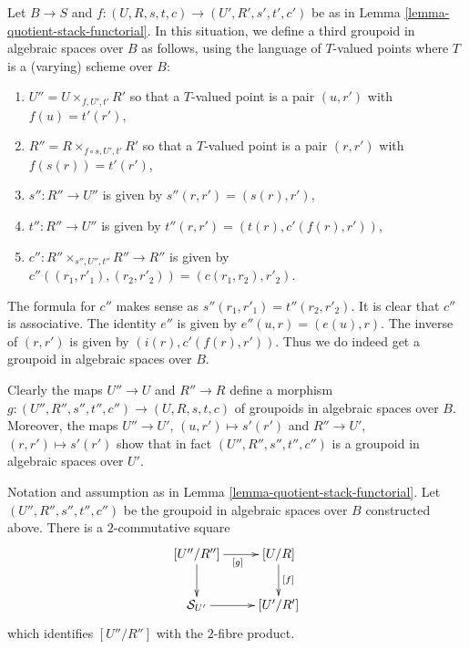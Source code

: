 \noindent
Let $B \to S$ and $f : (U, R, s, t, c) \to (U', R', s', t', c')$ be as in
Lemma \ref{lemma-quotient-stack-functorial}.
In this situation, we define a third groupoid in algebraic spaces over
$B$ as follows, using the language of $T$-valued points where $T$
is a (varying) scheme over $B$:
\begin{enumerate}
\item $U'' = U \times_{f, U', t'} R'$ so that a $T$-valued point is
a pair $(u, r')$ with $f(u) = t'(r')$,
\item $R'' = R \times_{f \circ s, U', t'} R'$ so that a $T$-valued point is
a pair $(r, r')$ with $f(s(r)) = t'(r')$,
\item $s'' : R'' \to U''$ is given by $s''(r, r') = (s(r), r')$,
\item $t'' : R'' \to U''$ is given by $t''(r, r') = (t(r), c'(f(r), r'))$,
\item $c'' : R'' \times_{s'', U'', t''} R'' \to R''$ is given by
$c''((r_1, r'_1), (r_2, r'_2)) = (c(r_1, r_2), r'_2)$.
\end{enumerate}
The formula for $c''$ makes sense as $s''(r_1, r'_1) = t''(r_2, r'_2)$.
It is clear that $c''$ is associative. The identity $e''$ is given by
$e''(u, r) = (e(u), r)$. The inverse of $(r, r')$ is given by
$(i(r), c'(f(r), r'))$. Thus we do indeed get a groupoid
in algebraic spaces over $B$.

\medskip\noindent
Clearly the maps $U'' \to U$ and $R'' \to R$ define a morphism
$g : (U'', R'', s'', t'', c'') \to (U, R, s, t, c)$
of groupoids in algebraic spaces over $B$. Moreover, the maps
$U'' \to U'$, $(u, r') \mapsto s'(r')$ and
$R'' \to U'$, $(r, r') \mapsto s'(r')$ show that in fact
$(U'', R'', s'', t'', c'')$ is a groupoid in algebraic spaces over $U'$.

\begin{lemma}
\label{lemma-cartesian-square-of-morphism}
Notation and assumption as in
Lemma \ref{lemma-quotient-stack-functorial}.
Let $(U'', R'', s'', t'', c'')$ be the groupoid in algebraic spaces over $B$
constructed above.
There is a $2$-commutative square
$$
\xymatrix{
[U''/R''] \ar[d] \ar[r]_{[g]} & [U/R] \ar[d]^{[f]} \\
\mathcal{S}_{U'} \ar[r] & [U'/R']
}
$$
which identifies $[U''/R'']$ with the $2$-fibre product.
\end{lemma}

